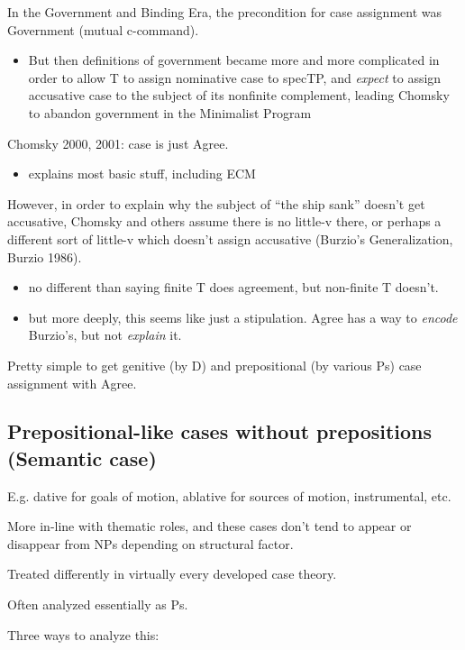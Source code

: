In the Government and Binding Era, the precondition for case assignment was Government (mutual c-command).

\begin{itemize}
  \item But then definitions of government became more and more complicated in order to allow T to assign nominative case to specTP, and \textit{expect} to assign accusative case to the subject of its nonfinite complement, leading Chomsky to abandon government in the Minimalist Program
\end{itemize}

Chomsky 2000, 2001: case is just Agree.

\begin{itemize}
  \item explains most basic stuff, including ECM
\end{itemize}

However, in order to explain why the subject of ``the ship sank'' doesn't get accusative, Chomsky and others assume there is no little-v there, or perhaps a different sort of little-v which doesn't assign accusative (Burzio's Generalization, Burzio 1986).

\begin{itemize}
  \item no different than saying finite T does agreement, but non-finite T doesn't.
  \item but more deeply, this seems like just a stipulation. Agree has a way to \textit{encode} Burzio's, but not \textit{explain} it.
\end{itemize}

Pretty simple to get genitive (by D) and prepositional (by various Ps) case assignment with Agree.

\subsection*{Prepositional-like cases without prepositions (Semantic case)}

E.g. dative for goals of motion, ablative for sources of motion, instrumental, etc.

More in-line with thematic roles, and these cases don't tend to appear or disappear from NPs depending on structural factor.

Treated differently in virtually every developed case theory.

Often analyzed essentially as Ps.

Three ways to analyze this:

